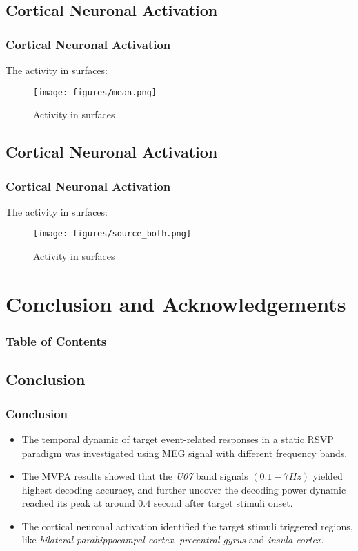 \documentclass[aspectratio=169]{beamer}
\begin{document}
\subsection{Cortical Neuronal Activation}

\begin{frame}
    \frametitle{Cortical Neuronal Activation}
    The activity in surfaces:

    \begin{figure}[h]
        \centering
        \texttt{[image: figures/mean.png]}
        \caption{Activity in surfaces}
    \end{figure}

\end{frame}

\subsection{Cortical Neuronal Activation}

\begin{frame}
    \frametitle{Cortical Neuronal Activation}
    The activity in surfaces:

    \begin{figure}[h]
        \centering
        \texttt{[image: figures/source\_both.png]}
        \caption{Activity in surfaces}
    \end{figure}

\end{frame}

\section{Conclusion and Acknowledgements}

\begin{frame}[plain]
    \frametitle{Table of Contents}
\end{frame}

\subsection{Conclusion}

\begin{frame}
    \frametitle{Conclusion}
    \begin{itemize}
        \item The temporal dynamic of target event-related responses in a static RSVP paradigm was investigated using MEG signal with different frequency bands.
        \item The MVPA results showed that the \emph{U07} band signals $(0.1-7 Hz)$ yielded highest decoding accuracy, and further uncover the decoding power dynamic reached its peak at around $0.4$ second after target stimuli onset.
        \item The cortical neuronal activation identified the target stimuli triggered regions, like \emph{bilateral parahippocampal cortex}, \emph{precentral gyrus} and \emph{insula cortex}.
    \end{itemize}
\end{frame}
\end{document}
